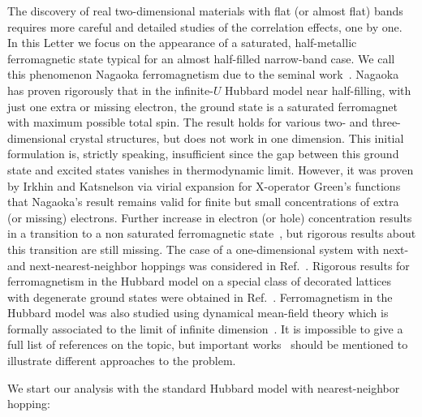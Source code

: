 The discovery of real two-dimensional materials with flat (or almost flat) bands requires more careful and detailed studies of the correlation effects, one by one. In this Letter we focus on the appearance of a saturated, half-metallic ferromagnetic state typical for an almost half-filled narrow-band case. We call this phenomenon Nagaoka ferromagnetism due to the seminal work~\cite{nagaoka1966ferromagnetism}.
Nagaoka has proven rigorously that in the infinite-$U$ Hubbard model near half-filling, with just one extra or missing electron, the ground state is a saturated ferromagnet with maximum possible total spin. The result holds for various two- and three-dimensional crystal structures, but does not work in one dimension.
This initial formulation is, strictly speaking, insufficient since the gap between this ground state and excited states vanishes in thermodynamic limit. However, it was proven by Irkhin and Katsnelson via virial expansion for X-operator Green's functions~\cite{irkhin1985spin} that Nagaoka's result remains valid for finite but small concentrations of extra (or missing) electrons. Further increase in electron (or hole) concentration results in a transition to a non saturated ferromagnetic state~\cite{edwards,irkhin1990katsnelson,irkhin_zarubin}, but rigorous results about this transition are still missing.
The case of a one-dimensional system with next- and next-nearest-neighbor hoppings was considered in Ref.~\cite{muller1995ferromagnetism}. Rigorous results for ferromagnetism in the Hubbard model on a special class of decorated lattices with degenerate ground states were obtained in Ref.~\cite{mielke1993ferromagnetism}. Ferromagnetism in the Hubbard model was also studied using dynamical mean-field theory which is formally associated to the limit of infinite dimension~\cite{uhrig1996exact,held1996correlated,vollhardt1996non}. It is impossible to give a full list of references on the topic, but important works~\cite{tasaki1998nagaoka,maksymenko2012flat,mielke1999ferromagnetism,tamura2002flat,roth1969electron,jarrett1968evidence,plischke1974ferromagnetism,hanisch1997lattice} should be mentioned to illustrate different approaches to the problem.


We start our analysis with the standard Hubbard model with nearest-neighbor hopping:

